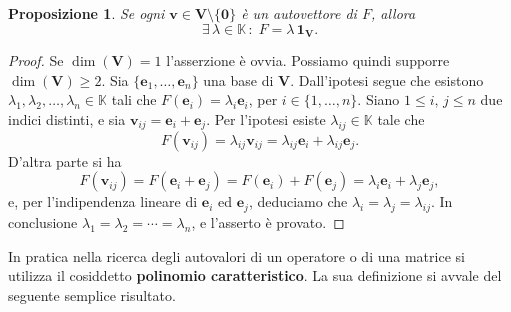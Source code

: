 \documentclass{article}
\theoremstyle{plain}
\newtheorem{prop}[thm]{Proposizione}
\theoremstyle{definition}
\theoremstyle{remark}
\begin{document}
\begin{bxthm}
\begin{prop}
Se ogni $\mathbf{v} \in \mathbf{V} \setminus \{\mathbf{0}\}$ è un autovettore di $F$, allora 
\[\exists\,\lambda \in \mathbb{K}\,:\;F = \lambda \, \mathbf{1_V}.\]
\end{prop}
\end{bxthm}
\begin{proof}
Se $\dim(\mathbf{V}) = 1$ l'asserzione è ovvia. Possiamo quindi supporre $\dim(\mathbf{V}) \geq 2$. 
Sia $\{\mathbf{e}_1, \ldots, \mathbf{e}_n\}$ una base di $\mathbf{V}$. Dall'ipotesi segue che esistono 
$\lambda_1, \lambda_2, \ldots, \lambda_n \in \mathbb{K}$ tali che $F(\mathbf{e}_i) = \lambda_i \mathbf{e}_i$, 
per $i \in \{1, \ldots, n\}$. Siano $1 \leq i,\, j \leq n$ due indici distinti, e sia $\mathbf{v}_{ij} = \mathbf{e}_i + \mathbf{e}_j$. 
Per l'ipotesi esiste $\lambda_{ij} \in \mathbb{K}$ tale che
\[
F(\mathbf{v}_{ij}) = \lambda_{ij} \mathbf{v}_{ij} = \lambda_{ij} \mathbf{e}_i + \lambda_{ij} \mathbf{e}_j.
\]
D'altra parte si ha
\[
F(\mathbf{v}_{ij}) = F(\mathbf{e}_i + \mathbf{e}_j) = F(\mathbf{e}_i) + F(\mathbf{e}_j) = \lambda_i \mathbf{e}_i + \lambda_j \mathbf{e}_j,
\]
e, per l'indipendenza lineare di $\mathbf{e}_i$ ed $\mathbf{e}_j$, deduciamo che $\lambda_i = \lambda_j = \lambda_{ij}$. 
In conclusione $\lambda_1 = \lambda_2 = \cdots = \lambda_n$, e l'asserto è provato.    
\end{proof}

\vspace{10pt}

In pratica nella ricerca degli autovalori di un operatore o di una matrice si utilizza il cosiddetto \textbf{polinomio caratteristico}. 
La sua definizione si avvale del seguente semplice risultato.

\vspace{10pt}
\end{document}
